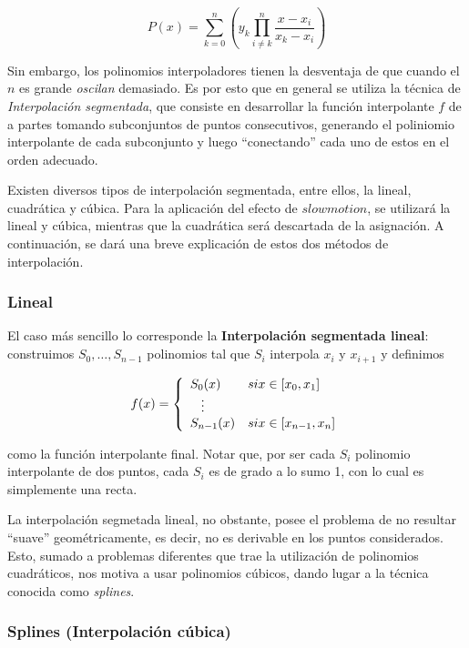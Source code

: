 \[P(x) = \sum_{k = 0}^n \left(y_k \prod_{i \neq k}^n \frac{x - x_i}{x_k - x_i}\right)\]

Sin embargo, los polinomios interpoladores tienen la desventaja de que cuando el $n$ es grande \emph{oscilan} demasiado. Es por esto que en general se utiliza la técnica de \emph{Interpolación segmentada}, que consiste en desarrollar la función interpolante $f$ de a partes tomando subconjuntos de puntos consecutivos, generando el poliniomio interpolante de cada subconjunto y luego ``conectando'' cada uno de estos en el orden adecuado.

Existen diversos tipos de interpolaci\'on segmentada, entre ellos, la lineal, cuadr\'atica y c\'ubica. Para la aplicaci\'on del efecto de $slowmotion$, se utilizar\'a la lineal y c\'ubica, mientras que la cuadr\'atica ser\'a descartada de la asignaci\'on. A continuaci\'on, se dar\'a una breve explicaci\'on de estos dos m\'etodos de interpolaci\'on. 

\subsubsection{Lineal}

El caso m\'as sencillo lo corresponde la \textbf{Interpolación segmentada lineal}: construimos $S_0, \ldots, S_{n - 1}$ polinomios tal que $S_i$ interpola $x_i$ y $x_{i + 1}$ y definimos

\[
f(x) = 
\left\{
    \begin{array}{ll}
        S_0(x)  & \mbox{si } x \in [x_{0}, x_1] \\
        \hspace{0.3cm}\vdots \\     
        S_{n - 1}(x) & \mbox{si } x \in [x_{n - 1}, x_n]
    \end{array}
\right.
\]

como la función interpolante final. Notar que, por ser cada $S_i$ polinomio interpolante de dos puntos, cada $S_i$ es de grado a lo sumo 1, con lo cual es simplemente una recta.

La interpolación segmetada lineal, no obstante, posee el problema de no resultar ``suave'' geométricamente, es decir, no es derivable en los puntos considerados. Esto, sumado a problemas diferentes que trae la utilización de polinomios cuadráticos, nos motiva a usar polinomios cúbicos, dando lugar a la técnica conocida como \emph{splines}.

\subsubsection{Splines (Interpolaci\'on c\'ubica)}

